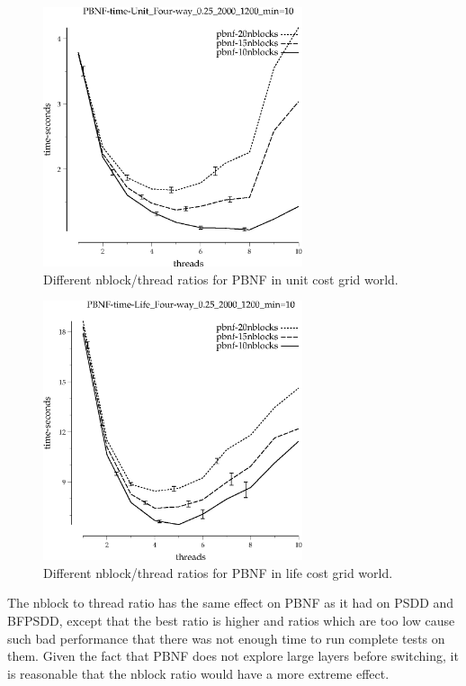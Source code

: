 \documentclass{article}
\begin{document}
\begin{figure}[h!]
\includegraphics[width=3in]{../graphs/grid_unit_four-way_0.25_2000_1200/PBNF-time-Unit_Four-way_0.25_2000_1200_min=10.eps}
\caption{Different nblock/thread ratios for PBNF in unit cost grid world.}
\label{fig:PBNF-nblock-grid}
\end{figure}

\begin{figure}[h!]
\includegraphics[width=3in]{../graphs/grid_life_four-way_0.25_2000_1200/PBNF-time-Life_Four-way_0.25_2000_1200_min=10.eps}
\caption{Different nblock/thread ratios for PBNF in life cost grid world.}
\label{fig:PBNF-nblock-life}
\end{figure}

The nblock to thread ratio has the same effect on PBNF as it had on PSDD and BFPSDD, except that the best ratio is higher and ratios which are too low cause such bad performance that there was not enough time to run complete tests on them. Given the fact that PBNF does not explore large layers before switching, it is reasonable that the nblock ratio would have a more extreme effect.
\end{document}
